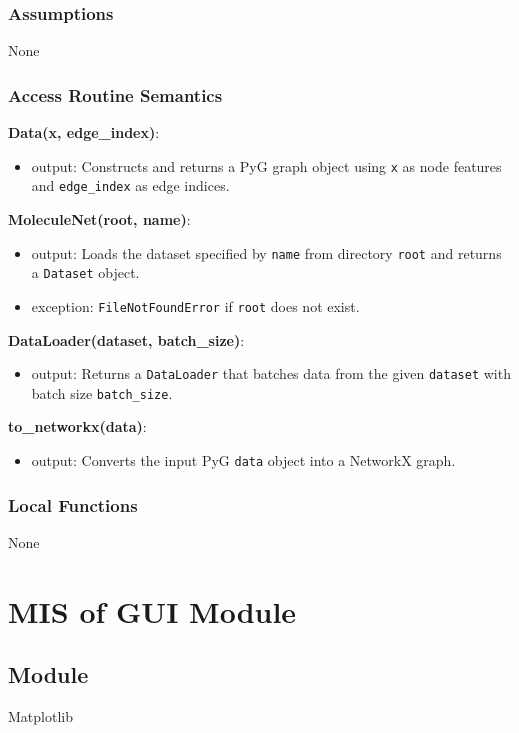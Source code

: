 \documentclass[12pt, titlepage]{article}
\begin{document}
\subsubsection{Assumptions}
None

\subsubsection{Access Routine Semantics}

\textbf{Data(x, edge\_index)}:
\begin{itemize}
  \item output: Constructs and returns a PyG graph object using \texttt{x} as node features and \texttt{edge\_index} as edge indices.
\end{itemize}

\textbf{MoleculeNet(root, name)}:
\begin{itemize}
  \item output: Loads the dataset specified by \texttt{name} from directory \texttt{root} and returns a \texttt{Dataset} object.
  \item exception: \texttt{FileNotFoundError} if \texttt{root} does not exist.
\end{itemize}

\textbf{DataLoader(dataset, batch\_size)}:
\begin{itemize}
  \item output: Returns a \texttt{DataLoader} that batches data from the given \texttt{dataset} with batch size \texttt{batch\_size}.
\end{itemize}

\textbf{to\_networkx(data)}:
\begin{itemize}
  \item output: Converts the input PyG \texttt{data} object into a NetworkX graph.
\end{itemize}

\subsubsection{Local Functions}
None


\section{MIS of GUI Module} \label{MatplotlibGUI}

\subsection{Module}
Matplotlib
\end{document}
